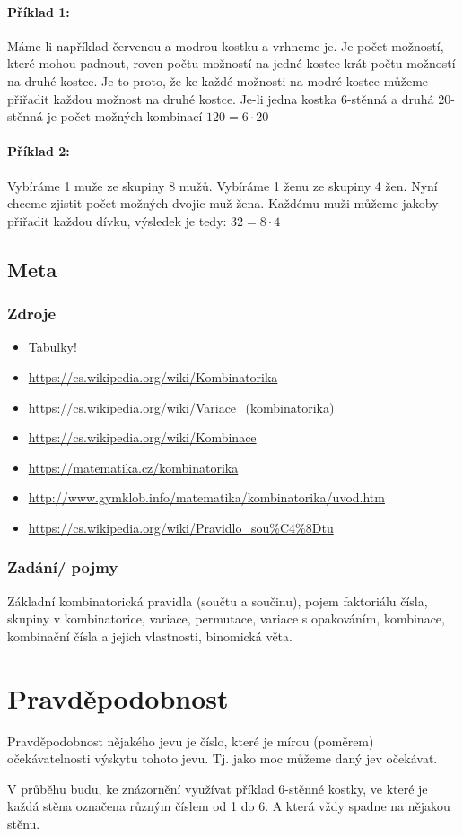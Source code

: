 \documentclass[12pt]{article}
\begin{document}
\paragraph{Příklad 1:} Máme-li například červenou a modrou kostku a vrhneme je. Je počet možností, které mohou padnout, roven počtu možností na jedné kostce krát počtu možností na druhé kostce. Je to proto, že ke každé možnosti na modré kostce můžeme přiřadit každou možnost na druhé kostce. Je-li jedna kostka 6-stěnná a druhá 20-stěnná je počet možných kombinací $120 = 6 \cdot 20$
\paragraph{Příklad 2:} Vybíráme 1 muže ze skupiny 8 mužů. Vybíráme 1 ženu ze skupiny 4 žen. Nyní chceme zjistit počet možných dvojic muž žena. Každému muži můžeme jakoby přiřadit každou dívku, výsledek je tedy: $32 = 8 \cdot 4$

\subsection{Meta}
\subsubsection{Zdroje}
\begin{itemize}
\item Tabulky!
\item \url{https://cs.wikipedia.org/wiki/Kombinatorika}
\item \url{https://cs.wikipedia.org/wiki/Variace_(kombinatorika)}
\item \url{https://cs.wikipedia.org/wiki/Kombinace}
\item \url{https://matematika.cz/kombinatorika}
\item \url{http://www.gymklob.info/matematika/kombinatorika/uvod.htm}
\item \url{https://cs.wikipedia.org/wiki/Pravidlo_sou\%C4\%8Dtu}
\end{itemize}
\subsubsection{Zadání/ pojmy}
Základní kombinatorická pravidla (součtu a součinu), pojem faktoriálu čísla, skupiny v kombinatorice, variace, permutace, variace s opakováním, kombinace, kombinační čísla a jejich vlastnosti, binomická věta.
\section{Pravděpodobnost}
Pravděpodobnost nějakého jevu je číslo, které je mírou (poměrem) očekávatelnosti výskytu tohoto jevu. Tj. jako moc můžeme daný jev očekávat.
\begin{scriptsize}
V průběhu budu, ke znázornění využívat příklad 6-stěnné kostky, ve které je každá stěna označena různým číslem od 1 do 6. A která vždy spadne na nějakou stěnu.
\end{scriptsize}
\end{document}
